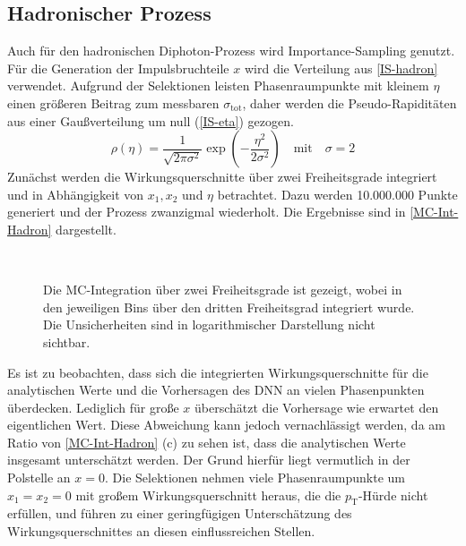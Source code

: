 \subsection{Hadronischer Prozess}
Auch für den hadronischen Diphoton-Prozess wird Importance-Sampling genutzt. Für die Generation der Impulsbruchteile $x$ wird die Verteilung aus \textsf{\autoref{IS-hadron}} verwendet. Aufgrund der Selektionen leisten Phasenraumpunkte mit kleinem $\eta$ einen größeren Beitrag zum messbaren $\sigma_{\text{tot}}$, daher werden die Pseudo-Rapiditäten aus einer Gaußverteilung um null (\textsf{\autoref{IS-eta}}) gezogen.
\begin{equation}
\rho(\eta) = \frac{1}{\sqrt{2\pi \sigma^2}} \exp(-\frac{\eta^2}{2\sigma^2}) \quad \text{mit} \quad \sigma=2
\label{IS-eta}
\end{equation}
Zunächst werden die Wirkungsquerschnitte über zwei Freiheitsgrade integriert und in Abhängigkeit von $x_1, x_2$ und $\eta$ betrachtet. Dazu werden 10.000.000 Punkte generiert und der Prozess zwanzigmal wiederholt. Die Ergebnisse sind in \textsf{\autoref{MC-Int-Hadron}} dargestellt.
\begin{figure}
	\centering
	 \\
	\caption{Die MC-Integration über zwei Freiheitsgrade ist gezeigt, wobei in den jeweiligen Bins über den dritten Freiheitsgrad integriert wurde. Die Unsicherheiten sind in logarithmischer Darstellung nicht sichtbar.}
	\label{MC-Int-Hadron}
\end{figure}
Es ist zu beobachten, dass sich die integrierten Wirkungsquerschnitte für die analytischen Werte und die Vorhersagen des DNN an vielen Phasenpunkten überdecken. Lediglich für große $x$ überschätzt die Vorhersage wie erwartet den eigentlichen Wert. Diese Abweichung kann jedoch vernachlässigt werden, da am Ratio von \textsf{\autoref{MC-Int-Hadron} (c)}  zu sehen ist, dass die analytischen Werte insgesamt unterschätzt werden. Der Grund hierfür liegt vermutlich in der Polstelle an $x=0$. Die Selektionen nehmen viele Phasenraumpunkte um $x_1 = x_2 = 0$ mit großem Wirkungsquerschnitt heraus, die die $p_\text{T}$-Hürde nicht erfüllen, und führen zu einer geringfügigen Unterschätzung des Wirkungsquerschnittes an diesen einflussreichen Stellen.
 
